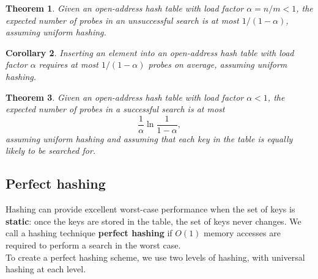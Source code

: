 \documentclass[12pt]{article}
\newtheorem{theorem}{Theorem}
\newtheorem{corollary}[theorem]{Corollary}
\begin{document}
\begin{theorem}
  Given an open-address hash table with load factor $\alpha =n/m < 1$, the expected number of probes in an unsuccessful search is at most $1/(1-\alpha)$, assuming uniform hashing.
\end{theorem}

\begin{corollary}
  Inserting an element into an open-address hash table with load factor $\alpha$ requires at most $1/(1-\alpha)$ probes on average, assuming uniform hashing.
\end{corollary}

\begin{theorem}
  Given an open-address hash table with load factor $\alpha < 1$, the expected number of probes in a successful search is at most
  \begin{equation*}
    \frac {1}{\alpha} \ln \frac {1}{1 - \alpha},
  \end{equation*}
  assuming uniform hashing and assuming that each key in the table is equally likely to be searched for.
\end{theorem}

\subsection{Perfect hashing}

Hashing can provide excellent worst-case performance when the set of keys is \textbf {static}: once the keys are stored in the table, the set of keys never changes. We call a hashing technique \textbf {perfect hashing} if $O(1)$ memory accesses are required to perform a search in the worst case. \\

To create a perfect hashing scheme, we use two levels of hashing, with universal hashing at each level.
\end{document}
